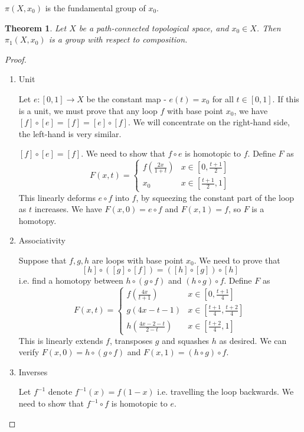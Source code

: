 \documentclass{article}
\theoremstyle{definition}
\theoremstyle{plain}%
\newtheorem{thm}{Theorem}[section]
\theoremstyle{remark}
\begin{document}
$\pi(X, x_0)$ is the fundamental group of $x_0$.

\begin{thm}
    Let $X$ be a path-connected topological space, and $x_0 \in X$. Then $\pi_1(X, x_0)$ is a group with respect to composition.
\end{thm}

\begin{proof}
     \begin{enumerate}
         \item Unit
         
         Let $e : [0,1] \to X$ be the constant map - $e(t) = x_0$ for all $t \in [0,1]$. If this is a unit, we must prove that any loop $f$ with base point $x_0$, we have $[f] \circ [e] = [f] = [e] \circ [f]$. We will concentrate on the right-hand side, the left-hand is very similar.
         
         $[f] \circ [e] = [ f]$. We need to show that $f \circ e$ is homotopic to $f$. Define $F$ as
         \[F(x,t) = \begin{cases} f(\frac{2x}{1+t}) &x\in[0,\frac{t+1}{2}] \\ x_0 &x \in [\frac{t+1}{2}, 1]\end{cases}\]
         This linearly deforms $e \circ f$ into $f$, by squeezing the constant part of the loop as $t$ increases. We have $F(x,0) = e \circ f$ and $F(x,1) = f$, so $F$ is a homotopy.
         \item Associativity
         
         Suppose that $f,g,h$ are loops with base point $x_0$. We need to prove that
         \[[h] \circ([g]\circ [f]) = ([h] \circ [g]) \circ [h]\]
         i.e. find a homotopy between $h \circ (g \circ f)$ and $(h \circ g) \circ f$.
         Define $F$ as
         \[F(x,t) = \begin{cases} 
            f(\frac{4x}{t+1}) &x \in [0, \frac{t+1}{4}] \\
            g(4x - t - 1)    &x \in [\frac{t+1}{4}, \frac{t+2}{4}] \\
            h(\frac{4x - 2 -t}{2-t}) &x \in [\frac{t+2}{4}, 1]
         \end{cases}\]
         This is linearly extends $f$, transposes $g$ and squashes $h$ as desired. We can verify $F(x,0) = h \circ (g \circ f)$ and $F(x,1) = (h \circ g) \circ f$.
         \item Inverses
         
         Let $f^{-1}$ denote $f^{-1}(x) = f(1-x)$ i.e. travelling the loop backwards. We need to show that $f^{-1} \circ f$ is homotopic to $e$.
         

\end{enumerate}
\end{proof}
\end{document}

